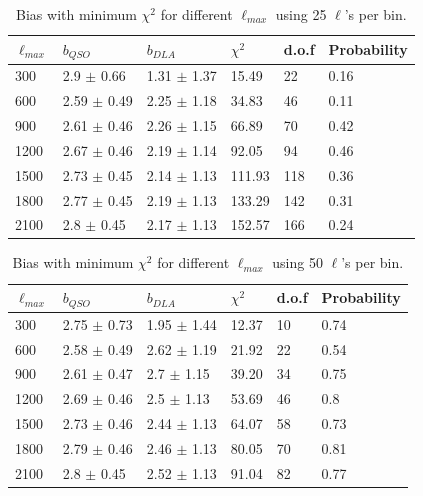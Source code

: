 \documentclass{amsart}
\begin{document}
\begin{table}[htbp]
\caption{Bias with minimum $\chi^2$  for different $\ell_{max}$ using 25 $\ell$'s per bin.}
\centering
\begin{tabular}{p{}p{}p{}p{}p{}p{}} \\ \toprule
$\ell_{max}$ & \multicolumn{1}{p{0cm}}{$b_{QSO}$} & $b_{DLA}$ & \multicolumn{1}{p{2cm}}{$\chi^2$} & d.o.f  & Probability\\ \midrule
300  &  2.9  $\pm$  0.66  &  1.31  $\pm$  1.37  &  15.49  &  22  &  0.16 \\
600  &  2.59  $\pm$  0.49  &  2.25  $\pm$  1.18  &  34.83  &  46  &  0.11 \\
900  &  2.61  $\pm$  0.46  &  2.26  $\pm$  1.15  &  66.89  &  70  &  0.42 \\
1200  &  2.67  $\pm$  0.46  &  2.19  $\pm$  1.14  &  92.05  &  94  &  0.46 \\
1500  &  2.73  $\pm$  0.45  &  2.14  $\pm$  1.13  &  111.93  &  118  &  0.36 \\
1800  &  2.77  $\pm$  0.45  &  2.19  $\pm$  1.13  &  133.29  &  142  &  0.31 \\
2100  &  2.8  $\pm$  0.45  &  2.17  $\pm$  1.13  &  152.57  &  166  &  0.24 \\ \bottomrule
\end{tabular}
\end{table}


\begin{table}[htbp]
\caption{Bias with minimum $\chi^2$  for different $\ell_{max}$ using 50 $\ell$'s per bin.}
\centering
\begin{tabular}{p{}p{}p{}p{}p{}p{}} \\ \toprule
$\ell_{max}$ & \multicolumn{1}{p{0cm}}{$b_{QSO}$} & $b_{DLA}$ & \multicolumn{1}{p{2cm}}{$\chi^2$} & d.o.f  & Probability\\ \midrule
300 & 2.75 $\pm$ 0.73 & 1.95 $\pm$ 1.44 & 12.37 & 10 & 0.74 \\
600 & 2.58 $\pm$ 0.49 & 2.62 $\pm$ 1.19 & 21.92 & 22 & 0.54 \\
900 & 2.61 $\pm$ 0.47& 2.7 $\pm$ 1.15 & 39.20 & 34 & 0.75  \\
1200  &  2.69  $\pm$  0.46  &  2.5  $\pm$  1.13  &  53.69  &  46  &  0.8 \\
1500  &  2.73  $\pm$  0.46  &  2.44  $\pm$  1.13  &  64.07  &  58  &  0.73 \\
1800  &  2.79  $\pm$  0.46  &  2.46  $\pm$  1.13  &  80.05  &  70  &  0.81 \\
2100  &  2.8  $\pm$  0.45  &  2.52  $\pm$  1.13  &  91.04  &  82  &  0.77 \\\bottomrule
\end{tabular}
\end{table}
\end{document}
